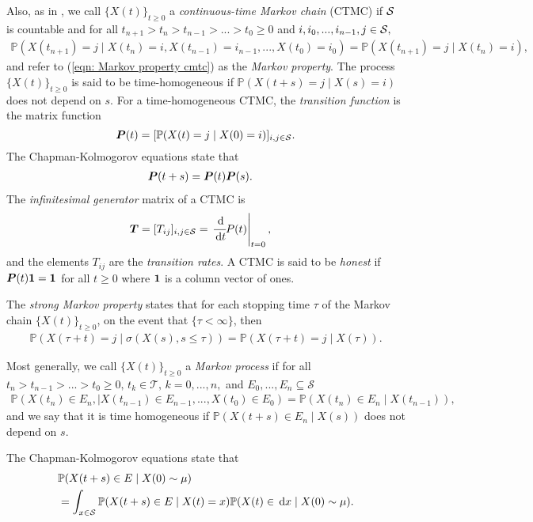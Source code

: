 Also, as in \cite[Section~1.3]{MEinAP}, we call \(\{X(t)\}_{t\geq 0}\) a \emph{continuous-time Markov chain} (CTMC) if \(\mathcal{S}\) is countable and for all \(t_{n+1} > t_n > t_{n-1} > ... > t_0 \geq 0\) and \(i,i_0,...,i_{n-1},j\in\mathcal{S},\)
\begin{align}\label{eqn: Markov property cmtc}
	\mathbb P(X(t_{n+1})=j \mid X(t_n)=i, X(t_{n-1})=i_{n-1},...,X(t_0)=i_0) = \mathbb P(X(t_{n+1})=j \mid X(t_n)=i),
\end{align}
and refer to (\ref{eqn: Markov property cmtc}) as the \emph{Markov property}. The process \(\{X(t)\}_{t\geq 0}\) is said to be time-homogeneous if 
\(\mathbb P(X(t+s)=j \mid X(s)=i)\) does not depend on \(s\). For a time-homogeneous CTMC, the \emph{transition function} is the matrix function 
\[\boldsymbol P(t) = [\mathbb P(X(t)=j \mid X(0)=i)]_{i,j\in\mathcal{S}}.\]
The Chapman-Kolmogorov equations state that 
\begin{align} 
	&\nonumber \boldsymbol P(t+s)=\boldsymbol P(t)\boldsymbol P(s).
\end{align}
The \emph{infinitesimal generator} matrix of a CTMC is 
\begin{align} 
	&\nonumber \boldsymbol T = [T_{ij}]_{i,j\in\mathcal{S}} = \left. \cfrac{\, \mathrm{d}}{\, \mathrm{d} t}P(t)\right|_{t=0},
\end{align}
and the elements \(T_{ij}\) are the \emph{transition rates}. A CTMC is said to be \emph{honest} if \(\boldsymbol P(t)\boldsymbol 1=\boldsymbol 1\) for all \(t\geq 0\) where \(\boldsymbol 1\) is a column vector of ones. 

The \emph{strong Markov property} states that for each stopping time \(\tau\) of the Markov chain \(\{X(t)\}_{t\geq 0}\), on the event that \(\{\tau<\infty\}\), then 
\begin{align}\label{eqn: strong Markov property ctmc}
	\mathbb P(X(\tau + t)=j \mid \sigma(X(s),s\leq \tau)) = \mathbb P(X(\tau+t)=j \mid X(\tau)).
\end{align}

Most generally, we call \(\{X(t)\}_{t\geq 0}\) a \emph{Markov process} if for all \(t_n > t_{n-1} > ... > t_0 \geq 0,\, t_k\in\mathcal T,\, k=0,...,n,\) and \(E_0,...,E_n\subseteq \mathcal S\)
\begin{align}\label{eqn: Markov process}
	\mathbb P(X(t_n)\in E_n,\mid X(t_{n-1})\in E_{n-1},...,X(t_0)\in E_0) 
	= \mathbb P(X(t_n)\in E_n\mid X(t_{n-1})),
\end{align}
and we say that it is time homogeneous if \(\mathbb P(X(t+s)\in E_n\mid X(s))\) does not depend on \(s\). 

The Chapman-Kolmogorov equations state that 
\begin{align}\label{eqn: CK}
	&\nonumber \mathbb P(X(t+s)\in E\mid X(0)\sim \mu) 
	\\&= \int_{x\in\mathcal{S}}\mathbb P(X(t+s)\in E\mid X(t)=x)\mathbb P(X(t)\in \, \mathrm{d} x\mid X(0)\sim \mu).
\end{align}

